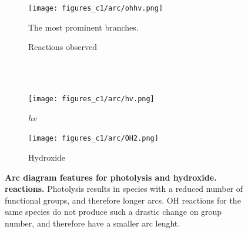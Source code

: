 \begin{figure}[H]
     \centering
      \begin{subfigure}[b]{.4\textwidth}
         \centering
         \texttt{[image: figures\_c1/arc/ohhv.png]}
         \caption{The most prominent branches. }
         \label{fig:ohhv}
     \end{subfigure}
      \begin{subfigure}[b]{.4\textwidth}
         \centering
    \hfill
         \caption{Reactions observed}
         \label{fig:rxnohhv}
     \end{subfigure}
     \\ \ \\
     \begin{subfigure}[b]{.4\textwidth}
         \centering
         \texttt{[image: figures\_c1/arc/hv.png]}
         \caption{$hv$}
         \label{fig:hv}
     \end{subfigure}
     \begin{subfigure}[b]{.4\textwidth}
         \centering
         \texttt{[image: figures\_c1/arc/OH2.png]}
         \caption{Hydroxide}
         \label{fig:oh2}
     \end{subfigure}
      \caption{\textbf{ Arc diagram features for photolysis and  hydroxide. reactions.  } Photolysis results in species with a reduced number of functional groups, and therefore longer arcs. OH reactions for the same species do not produce such a drastic change on group number, and therefore have a smaller arc lenght.}
        \label{fig:ohhv}
\end{figure}



